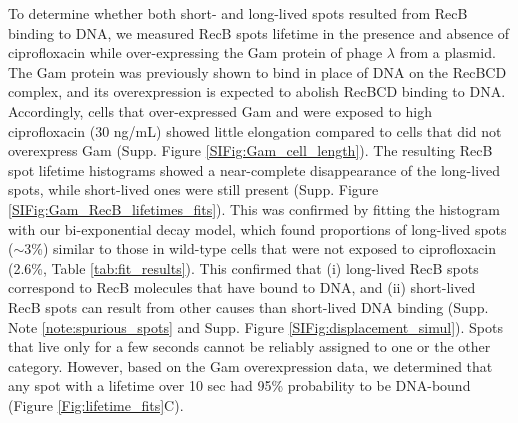 To determine whether both short- and long-lived spots resulted from RecB binding to DNA, we measured RecB spots lifetime in the presence and absence of ciprofloxacin while over-expressing the Gam protein of phage $\lambda$ from a plasmid. The Gam protein was previously shown to bind in place of DNA on the RecBCD complex\cite{Wilkinson2016}, and its overexpression is expected to abolish RecBCD binding to DNA. Accordingly, cells that over-expressed Gam and were exposed to high ciprofloxacin (30 ng/mL) showed little elongation compared to cells that did not overexpress Gam (Supp. Figure \ref{SIFig:Gam_cell_length}). The resulting RecB spot lifetime histograms showed a near-complete disappearance of the long-lived spots, while short-lived ones were still present (Supp. Figure \ref{SIFig:Gam_RecB_lifetimes_fits}). This was confirmed by fitting the histogram with our bi-exponential decay model, which found proportions of long-lived spots ($\sim$3\%) similar to those in wild-type cells that were not exposed to ciprofloxacin (2.6\%, Table \ref{tab:fit_results}). This confirmed that (i) long-lived RecB spots correspond to RecB molecules that have bound to DNA, and (ii) short-lived RecB spots can result from other causes than short-lived DNA binding (Supp. Note \ref{note:spurious_spots} and Supp. Figure \ref{SIFig:displacement_simul}). Spots that live only for a few seconds cannot be reliably assigned to one or the other category. However, based on the Gam overexpression data, we determined that any spot with a lifetime over 10 sec had 95\% probability to be DNA-bound (Figure \ref{Fig:lifetime_fits}C).

